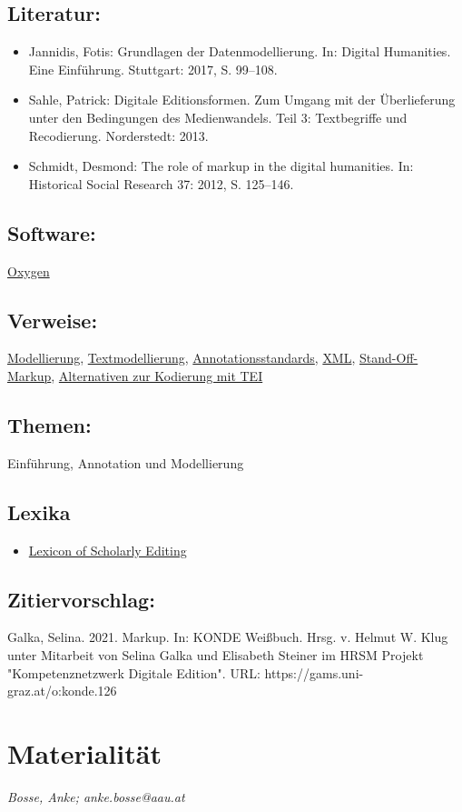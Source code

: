 \documentclass{article}
\begin{document}
        \subsection*{Literatur:}\begin{itemize}\item Jannidis, Fotis: Grundlagen der Datenmodellierung. In: Digital Humanities. Eine Einführung. Stuttgart: 2017, S. 99–108.\item Sahle, Patrick: Digitale Editionsformen. Zum Umgang mit der
                              Überlieferung unter den Bedingungen des Medienwandels. Teil 3:
                              Textbegriffe und Recodierung. Norderstedt: 2013.\item Schmidt, Desmond: The role of markup in the digital humanities. In: Historical Social Research 37: 2012, S. 125–146.\end{itemize}\subsection*{Software:}\href{http://oxygenxml.com/}{Oxygen}\subsection*{Verweise:}\href{https://gams.uni-graz.at/o:konde.137}{Modellierung}, \href{https://gams.uni-graz.at/o:konde.195}{Textmodellierung}, \href{https://gams.uni-graz.at/o:konde.29}{Annotationsstandards}, \href{https://gams.uni-graz.at/o:konde.215}{XML}, \href{https://gams.uni-graz.at/o:konde.171}{Stand-Off-Markup}, \href{https://gams.uni-graz.at/o:konde.15}{Alternativen zur Kodierung mit
                           TEI}\subsection*{Themen:}Einführung, Annotation und Modellierung\subsection*{Lexika}\begin{itemize}\item \href{https://lexiconse.uantwerpen.be/index.php/lexicon/markup/}{Lexicon of Scholarly Editing}\end{itemize}\subsection*{Zitiervorschlag:}Galka, Selina. 2021. Markup. In: KONDE Weißbuch. Hrsg. v. Helmut W. Klug unter Mitarbeit von Selina Galka und Elisabeth Steiner im HRSM Projekt "Kompetenznetzwerk Digitale Edition". URL: https://gams.uni-graz.at/o:konde.126\newpage\section*{Materialität} \emph{Bosse, Anke; anke.bosse@aau.at }\\
        
\end{document}
